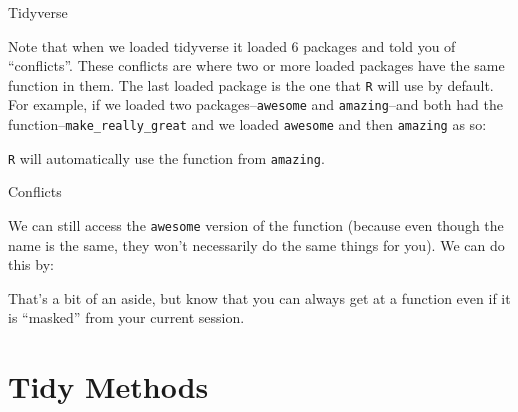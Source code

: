 \begin{frame}[fragile]{Tidyverse}

Note that when we loaded tidyverse it loaded 6 packages and told you of
``conflicts''. These conflicts are where two or more loaded packages
have the same function in them. The last loaded package is the one that
\texttt{R} will use by default. For example, if we loaded two
packages--\texttt{awesome} and \texttt{amazing}--and both had the
function--\texttt{make\_really\_great} and we loaded \texttt{awesome}
and then \texttt{amazing} as so:

\begin{Shaded}
\begin{Highlighting}[]
\end{Highlighting}
\end{Shaded}

\texttt{R} will automatically use the function from \texttt{amazing}.

\end{frame}

\begin{frame}[fragile]{Conflicts}

We can still access the \texttt{awesome} version of the function
(because even though the name is the same, they won't necessarily do the
same things for you). We can do this by:

\begin{Shaded}
\begin{Highlighting}[]
\OperatorTok{::}
\end{Highlighting}
\end{Shaded}

That's a bit of an aside, but know that you can always get at a function
even if it is ``masked'' from your current session.

\end{frame}

\section{Tidy Methods}\label{tidy-methods}

